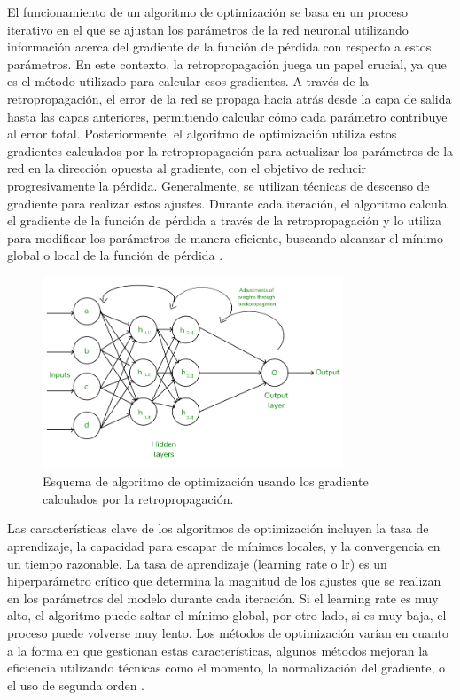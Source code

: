 El funcionamiento de un algoritmo de optimización se basa en un proceso iterativo en el que se ajustan los parámetros de la red neuronal utilizando información acerca del gradiente de la función de pérdida con respecto a estos parámetros. En este contexto, la retropropagación juega un papel crucial, ya que es el método utilizado para calcular esos gradientes. A través de la retropropagación, el error de la red se propaga hacia atrás desde la capa de salida hasta las capas anteriores, permitiendo calcular cómo cada parámetro contribuye al error total. Posteriormente, el algoritmo de optimización utiliza estos gradientes calculados por la retropropagación para actualizar los parámetros de la red en la dirección opuesta al gradiente, con el objetivo de reducir progresivamente la pérdida. Generalmente, se utilizan técnicas de descenso de gradiente para realizar estos ajustes. Durante cada iteración, el algoritmo calcula el gradiente de la función de pérdida a través de la retropropagación y lo utiliza para modificar los parámetros de manera eficiente, buscando alcanzar el mínimo global o local de la función de pérdida \cite{bottou2010large}.

\begin{figure}[H]
    \centering
    \includegraphics[width=0.8\textwidth]{./img/modelo/retropropagacion.png}
    \caption{Esquema de algoritmo de optimización usando los gradiente calculados por la retropropagación. \cite{msmk2023backpropagation}}
    \label{fig:esq-Optimizacion}
\end{figure}



Las características clave de los algoritmos de optimización incluyen la tasa de aprendizaje, la capacidad para escapar de mínimos locales, y la convergencia en un tiempo razonable. La tasa de aprendizaje (learning rate o lr) es un hiperparámetro crítico que determina la magnitud de los ajustes que se realizan en los parámetros del modelo durante cada iteración. Si el learning rate es muy alto, el algoritmo puede saltar el mínimo global, por otro lado, si es muy baja, el proceso puede volverse muy lento. Los métodos de optimización varían en cuanto a la forma en que gestionan estas características, algunos métodos mejoran la eficiencia utilizando técnicas como el momento, la normalización del gradiente, o el uso de segunda orden \cite{kingma2014adam}.


